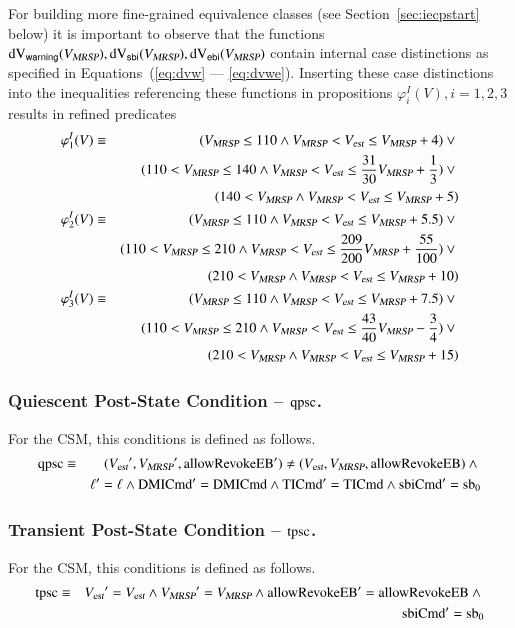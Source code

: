 For building more fine-grained equivalence classes (see Section~\ref{sec:iecpstart} below) it is important to observe that the functions $\dvw(\vmax), \dvs(\vmax), \dve(\vmax)$ contain  internal case distinctions as specified in Equations~(\ref{eq:dvw} --- \ref{eq:dvwe}). Inserting 
these case distinctions into the inequalities referencing  these functions in propositions 
$\varphi_i^I(V), i = 1,2,3$ results in refined predicates 
\footnotesize
\begin{eqnarray}
\varphi_1^I(V) & \equiv  &  (\vmax \le 110 \wedge   \vmax <  \vest \le \vmax +4) \vee {}
\\ & & (110<\vmax  \le 140  \wedge \vmax < \vest \le \frac{31}{30}\vmax +\frac{1}{3} )
\vee {}
\\ & & (140<\vmax \wedge  \vmax < \vest \le \vmax +5)
\\
\varphi_2^I(V) &  \equiv  &  (\vmax \le 110 \wedge  \vmax < \vest \le \vmax + 5.5 ) \vee {} 
\\ & & (110 <\vmax  \le 210 \wedge 
\vmax < \vest \le\frac{209}{200}\vmax +\frac{55}{100}) \vee {}
\\ & &  (210 < \vmax  \wedge  \vmax <  \vest \le\vmax + 10)  
 \\
\varphi_3^I(V) & \equiv & (\vmax \le 110 \wedge \vmax < \vest \le  \vmax + 7.5) \vee {}
\\ & & (110<\vmax  \le 210 \wedge  \vmax < \vest \le  \frac{43}{40}\vmax -\frac{3}{4})
\vee {}
\\ & & (210<\vmax   \wedge  \vmax < \vest \le  \vmax +15)
\end{eqnarray}
\normalsize



\subsubsection{Quiescent Post-State Condition -- $\qpsc$.}
For the CSM, this conditions is defined as follows.
\footnotesize
\begin{eqnarray*}
\qpsc &\equiv& (\vest',\vmax',\areb') \neq (\vest,\vmax,\areb) \wedge {}
\\ & & \ell' = \ell \wedge \dmicmd' = \dmicmd \wedge \ticmd' = \ticmd \wedge \sbicmd' = \sbz
\end{eqnarray*}
\normalsize



\subsubsection{Transient Post-State Condition -- $\tpsc$.}
For the CSM, this conditions is defined as follows.
\footnotesize
\begin{eqnarray*}
\tpsc &\equiv& \vest' = \vest \wedge \vmax' = \vmax \wedge \areb' = \areb \wedge {}
\\ & & \sbicmd' = \sbz
\end{eqnarray*}
\normalsize

